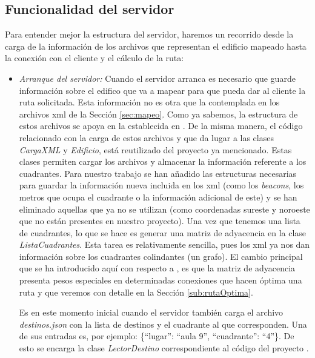 \subsection{Funcionalidad del servidor}

Para entender mejor la estructura del servidor, haremos un recorrido desde la carga de la información de los archivos que representan el edificio mapeado hasta la conexión con el cliente y el cálculo de la ruta: 

\begin{itemize}
	\item \textit{Arranque del servidor:} Cuando el servidor arranca es necesario que guarde información sobre el edifico que va a mapear para que pueda dar al cliente la ruta solicitada. Esta información no es otra que la contemplada en los archivos xml de la Sección \ref{sec:mapeo}. Como ya sabemos, la estructura de estos archivos se apoya en la establecida en \cite{TFGguia}. De la misma manera, el código relacionado con la carga de estos archivos y que da lugar a las clases \textit{CargaXML} y \textit{Edificio}, está reutilizado del proyecto ya mencionado. Estas clases permiten cargar los archivos y almacenar la información referente a los cuadrantes. Para nuestro trabajo se han añadido las estructuras necesarias para guardar la información nueva incluida en los xml (como los \textit{beacons}, los metros que ocupa el cuadrante o la información adicional de este) y se han eliminado aquellas que ya no se utilizan (como coordenadas sureste y noroeste que no están presentes en nuestro proyecto). Una vez que tenemos una lista de cuadrantes, lo que se hace es generar una matriz de adyacencia en la clase \textit{ListaCuadrantes}. Esta tarea es relativamente sencilla, pues los xml ya nos dan información sobre los cuadrantes colindantes (un grafo). El cambio principal que se ha introducido aquí con respecto a \citep{TFGguia}, es que la matriz de adyacencia presenta pesos especiales en determinadas conexiones que hacen óptima una ruta y que veremos con detalle en la Sección \ref{sub:rutaOptima}. 
	
	Es en este momento inicial cuando el servidor también carga el archivo \textit{destinos.json} con la lista de destinos y el cuadrante al que corresponden. Una de sus entradas es, por ejemplo: \{``lugar'': ``aula 9'', ``cuadrante'': ``4''\}. De esto se encarga la clase \textit{LectorDestino} correspondiente al código del proyecto \cite{TFGguia}.
	

\end{itemize}
